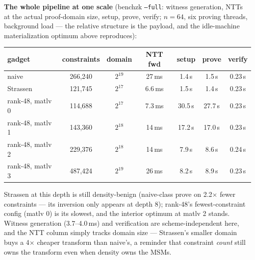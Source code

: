 \documentclass[10pt]{article}
\begin{document}
\textbf{The whole pipeline at one scale} (benchzk
\texttt{--full}: witness generation, NTTs at the actual
proof-domain size, setup, prove, verify; $n = 64$, six proving
threads, background load --- the relative structure is the
payload, and the idle-machine materialization optimum above
reproduces):
\begin{center}
\begin{tabular}{lcccccc}
gadget & constraints & domain & NTT fwd & setup & prove & verify\\
\hline
naive & 266{,}240 & $2^{19}$ & 27\,ms & 1.4\,s & 1.5\,s & 0.23\,s\\
Strassen & 121{,}745 & $2^{17}$ & 6.6\,ms & 1.5\,s & 1.4\,s & 0.23\,s\\
rank-48, matlv 0 & 114{,}688 & $2^{17}$ & 7.3\,ms & 30.5\,s & 27.7\,s & 0.23\,s\\
rank-48, matlv 1 & 143{,}360 & $2^{18}$ & 14\,ms & 17.2\,s & 17.0\,s & 0.23\,s\\
rank-48, matlv 2 & 229{,}376 & $2^{18}$ & 14\,ms & 7.9\,s & 8.6\,s & 0.24\,s\\
rank-48, matlv 3 & 487{,}424 & $2^{19}$ & 26\,ms & 8.2\,s & 8.9\,s & 0.23\,s\\
\end{tabular}
\end{center}
Strassen at this depth is still density-benign (naive-class prove
on 2.2$\times$ fewer constraints --- its inversion only appears at
depth 8); rank-48's fewest-constraint config (matlv 0) is its
slowest, and the interior optimum at matlv 2 stands. Witness
generation (3.7--4.0\,ms) and verification are scheme-independent
here, and the NTT column simply tracks domain size --- Strassen's
smaller domain buys a 4$\times$ cheaper transform than naive's, a
reminder that constraint \emph{count} still owns the transform
even when density owns the MSMs.
\end{document}
